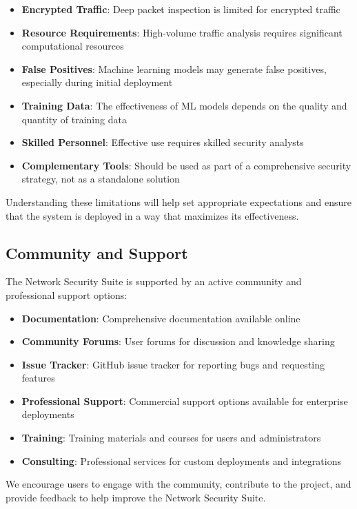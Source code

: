 \begin{itemize}
    \item \textbf{Encrypted Traffic}: Deep packet inspection is limited for encrypted traffic
    \item \textbf{Resource Requirements}: High-volume traffic analysis requires significant computational resources
    \item \textbf{False Positives}: Machine learning models may generate false positives, especially during initial deployment
    \item \textbf{Training Data}: The effectiveness of ML models depends on the quality and quantity of training data
    \item \textbf{Skilled Personnel}: Effective use requires skilled security analysts
    \item \textbf{Complementary Tools}: Should be used as part of a comprehensive security strategy, not as a standalone solution
\end{itemize}

Understanding these limitations will help set appropriate expectations and ensure that the system is deployed in a way that maximizes its effectiveness.

\subsection{Community and Support}
The Network Security Suite is supported by an active community and professional support options:

\begin{itemize}
    \item \textbf{Documentation}: Comprehensive documentation available online
    \item \textbf{Community Forums}: User forums for discussion and knowledge sharing
    \item \textbf{Issue Tracker}: GitHub issue tracker for reporting bugs and requesting features
    \item \textbf{Professional Support}: Commercial support options available for enterprise deployments
    \item \textbf{Training}: Training materials and courses for users and administrators
    \item \textbf{Consulting}: Professional services for custom deployments and integrations
\end{itemize}

We encourage users to engage with the community, contribute to the project, and provide feedback to help improve the Network Security Suite.

